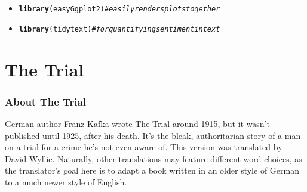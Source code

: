\documentclass[10pt]{beamer}\usepackage[]{graphicx}\usepackage[]{color}
\makeatletter
\newcommand{\hlcom}[1]{\textcolor[rgb]{0.678,0.584,0.686}{\textit{#1}}}%
\newcommand{\hlstd}[1]{\textcolor[rgb]{0.345,0.345,0.345}{#1}}%
\newcommand{\hlkwd}[1]{\textcolor[rgb]{0.737,0.353,0.396}{\textbf{#1}}}%
\newenvironment{kframe}{%
 \def\at@end@of@kframe{}%
 \ifinner\ifhmode%
  \def\at@end@of@kframe{\end{minipage}}%
  \begin{minipage}{\columnwidth}%
 \fi\fi%
 \def\FrameCommand##1{\hskip\@totalleftmargin \hskip-\fboxsep
 \colorbox{shadecolor}{##1}\hskip-\fboxsep
     \hskip-\linewidth \hskip-\@totalleftmargin \hskip\columnwidth}%
 \MakeFramed {\advance\hsize-\width
   \@totalleftmargin\z@ \linewidth\hsize
   \@setminipage}}%
 {\par\unskip\endMakeFramed%
 \at@end@of@kframe}
\newenvironment{knitrout}{}{} %
\makeatother
\begin{document}
\begin{frame}[fragile]
\begin{itemize}
\begin{knitrout}
\begin{kframe}
\begin{alltt}
\end{alltt}
\end{kframe}
\end{knitrout}
      \item
\begin{knitrout}
\color{fgcolor}\begin{kframe}
\begin{alltt}
\hlkwd{library}\hlstd{(easyGgplot2)} \hlcom{#easily renders plots together}
\end{alltt}
\end{kframe}
\end{knitrout}
      \item
\begin{knitrout}
\color{fgcolor}\begin{kframe}
\begin{alltt}
\hlkwd{library}\hlstd{(tidytext)} \hlcom{#for quantifying sentiment in text}
\end{alltt}
\end{kframe}
\end{knitrout}
    
    \end{itemize}
\end{frame}

\section{The Trial}
\begin{frame}[fragile]
  \frametitle{About The Trial}
German author Franz Kafka wrote The Trial around 1915, but it wasn't published until 1925, after his death. It's the bleak, authoritarian story of a man on a trial for a crime he's not even aware of. This version was translated by David Wyllie. Naturally, other translations may feature different word choices, as the translator's goal here is to adapt a book written in an older style of German to a much newer style of English.
\end{frame}
\end{document}
